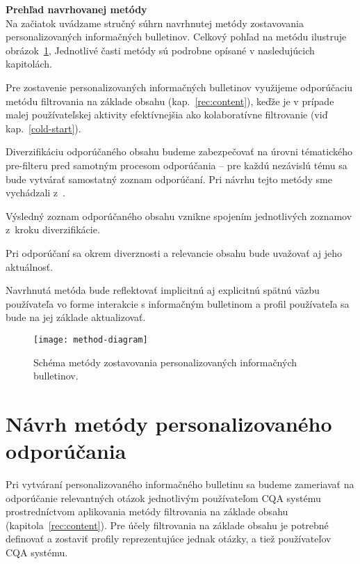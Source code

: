 \textbf{Prehľad navrhovanej metódy}\\
Na začiatok uvádzame stručný súhrn navrhnutej metódy zostavovania personalizovaných informačných bulletinov.
Celkový pohľad na metódu ilustruje obrázok~\ref{fig:overview}, Jednotlivé časti metódy sú podrobne opísané v nasledujúcich kapitolách.
\begin{my_itemize}
\item{
    Pre zostavenie personalizovaných informačných bulletinov využijeme odporúčaciu metódu filtrovania na základe obsahu
    (kap.~\ref{rec:content}), keďže je v prípade malej používateľskej aktivity efektívnejšia ako kolaboratívne filtrovanie
    (viď kap.~\ref{cold-start}).
}
\item{
    Diverzifikáciu odporúčaného obsahu budeme zabezpečovať na úrovni tématického pre-filteru pred samotným procesom
    odporúčania -- pre každú nezávislú tému sa bude vytvárať samostatný zoznam odporúčaní.
    Pri návrhu tejto metódy sme vychádzali z~\cite{Szpektor2013}.
}
\item{Výsledný zoznam odporúčaného obsahu vznikne spojením jednotlivých zoznamov z~kroku diverzifikácie.}
\item{Pri odporúčaní sa okrem diverznosti a relevancie obsahu bude uvažovať aj jeho aktuálnosť.}
\item{
    Navrhnutá metóda bude reflektovať implicitnú aj explicitnú spätnú väzbu používateľa vo forme interakcie
    s informačným bulletinom a profil používateľa sa bude na jej základe aktualizovať.
}
\end{my_itemize}

\begin{figure}[H]\begin{center}
\texttt{[image: method-diagram]}
\caption{Schéma metódy zostavovania personalizovaných informačných bulletinov.\label{fig:overview}}\end{center}
\end{figure}

\section{Návrh metódy personalizovaného odporúčania}


Pri vytváraní personalizovaného informačného bulletinu sa budeme zameriavať na odporúčanie relevantných otázok jednotlivým
používateľom CQA systému prostredníctvom aplikovania metódy filtrovania na základe obsahu (kapitola~\ref{rec:content}).
Pre účely filtrovania na základe obsahu je potrebné definovať a zostaviť profily reprezentujúce jednak otázky, a tiež
používateľov CQA systému.

